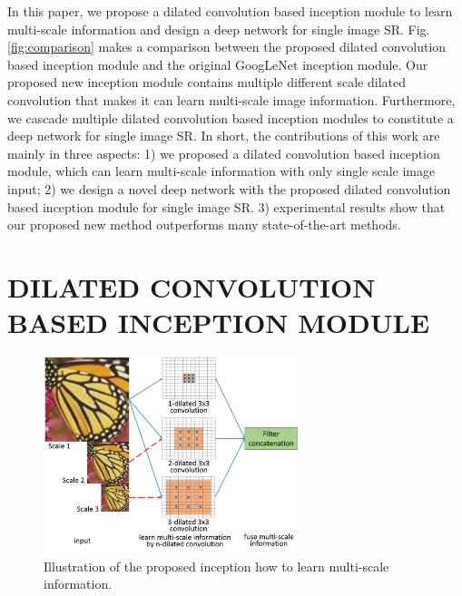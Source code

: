 \documentclass{article}
\begin{document}
In this paper, we propose a dilated convolution based inception module to learn multi-scale information and design a deep network for single image SR. Fig. \ref{fig:comparison} makes a comparison between the proposed dilated convolution based inception module and the original GoogLeNet inception module. Our proposed new inception module contains multiple different scale dilated convolution that makes it can learn multi-scale image information. Furthermore, we cascade multiple dilated convolution based inception modules to constitute a deep network for single image SR. In short, the contributions of this work are mainly in three aspects: 1) we proposed a dilated convolution based inception module, which can learn multi-scale information with only single scale image input; 2) we design a novel deep network with the proposed dilated convolution based inception module for single image SR. 3) experimental results show that our proposed new method outperforms many state-of-the-art methods.

\section{DILATED CONVOLUTION BASED INCEPTION MODULE}
\label{sec:dilated}

\begin{figure}[htb]

\begin{minipage}[b]{1.0\linewidth}
  \centering
  \centerline{\includegraphics[width=7.5cm]{illustrationoftheproposedinceptionhowtolearnmultiscaleinformation.png}}
\end{minipage}
\vspace{-0.95cm}
\caption{Illustration of the proposed inception how to learn multi-scale information.}
\label{fig:illustration}
\vspace{-0.5cm}
%
\end{figure}
\end{document}
